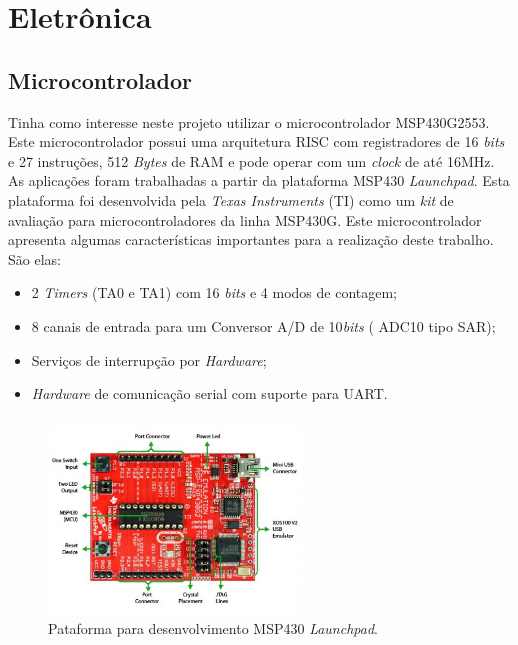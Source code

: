 \chapter{Eletrônica}
\label{eletronica}

\section{Microcontrolador} %
\label{sec:msp430}

Tinha como interesse neste projeto utilizar o microcontrolador MSP430G2553. Este microcontrolador possui uma arquitetura RISC com registradores de 16 \textit{bits} e 27 instruções, 512 \textit{Bytes} de RAM e pode operar com um \textit{clock} de até 16MHz. As aplicações foram trabalhadas a partir da plataforma MSP430 \textit{Launchpad}. Esta plataforma foi desenvolvida pela \textit{Texas Instruments} (TI) como um \textit{kit} de avaliação para microcontroladores da linha MSP430G. Este microcontrolador apresenta algumas características importantes para a realização deste trabalho. São elas:
\begin {itemize}
	\item 2 \textit{Timers} (TA0 e TA1) com 16 \textit{bits} e 4 modos de contagem;
	\item 8 canais de entrada para um Conversor A/D de 10\textit{bits} ( ADC10 tipo SAR);
	\item Serviços de interrupção por \textit{Hardware};
	\item \textit{Hardware} de comunicação serial com suporte para UART.
\end {itemize}

\begin{figure}[h]
  \centering
  \includegraphics[width=0.6\textwidth]
      {figuras/Launchpad.jpg}
  \caption{Pataforma para desenvolvimento MSP430 \textit{Launchpad}.}
  \label{Launchpad}
\end{figure}

